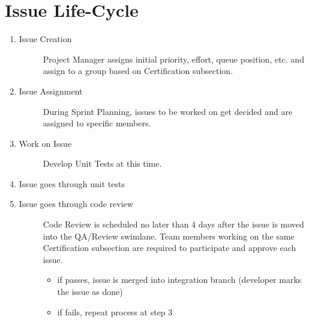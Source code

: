 \documentclass[letterpaper,10pt,english]{sphinxmanual}
\begin{document}
\section{Issue Life-Cycle}
\label{\detokenize{test_plan/issue_management:issue-life-cycle}}\begin{enumerate}
\def\theenumi{\arabic{enumi}}
\def\labelenumi{\theenumi .}
\makeatletter\def\p@enumii{\p@enumi \theenumi .}\makeatother
\item {} \begin{description}
\item[{Issue Creation}] \leavevmode
Project Manager assigns initial priority, effort, queue position, etc. and assign to a group based on Certification subsection.

\end{description}

\item {} \begin{description}
\item[{Issue Assignment}] \leavevmode
During Sprint Planning, issues to be worked on get decided and are assigned to specific members.

\end{description}

\item {} \begin{description}
\item[{Work on Issue}] \leavevmode
Develop Unit Tests at this time.

\end{description}

\item {} 
Issue goes through unit tests

\item {} \begin{description}
\item[{Issue goes through code review}] \leavevmode
Code Review is scheduled no later than 4 days after the issue is moved into the QA/Review swimlane. Team members working on the same Certification subsection are required to participate and approve each issue.
\begin{itemize}
\item {} 
if passes, issue is merged into integration branch (developer marks the issue as done)

\item {} 
if fails, repeat process at step 3

\end{itemize}

\end{description}

\end{enumerate}
\end{document}
